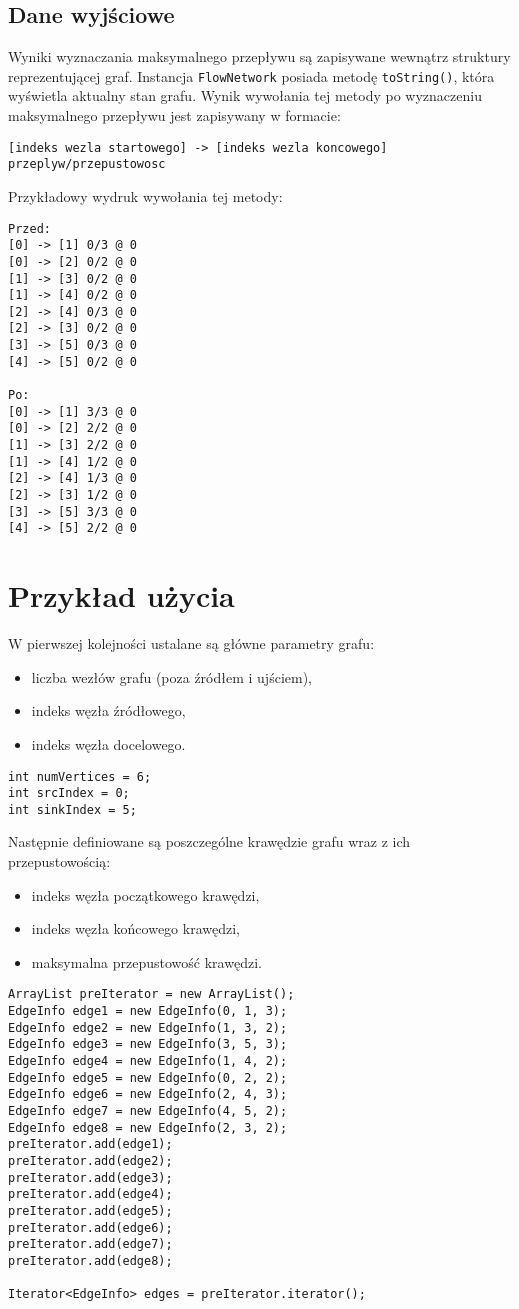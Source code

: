 \documentclass[10pt]{dokument-tiwo}
\begin{document}
\subsection{Dane wyjściowe}
Wyniki wyznaczania maksymalnego przepływu są zapisywane wewnątrz struktury
reprezentującej graf. Instancja \texttt{FlowNetwork} posiada metodę
\texttt{toString()}, która wyświetla aktualny stan grafu. Wynik wywołania
tej metody po wyznaczeniu maksymalnego przepływu jest zapisywany w formacie:
\begin{lstlisting}
[indeks wezla startowego] -> [indeks wezla koncowego] przeplyw/przepustowosc
\end{lstlisting}

\noindent
Przykładowy wydruk wywołania tej metody:
\begin{lstlisting}
Przed:
[0] -> [1] 0/3 @ 0
[0] -> [2] 0/2 @ 0
[1] -> [3] 0/2 @ 0
[1] -> [4] 0/2 @ 0
[2] -> [4] 0/3 @ 0
[2] -> [3] 0/2 @ 0
[3] -> [5] 0/3 @ 0
[4] -> [5] 0/2 @ 0

Po:
[0] -> [1] 3/3 @ 0
[0] -> [2] 2/2 @ 0
[1] -> [3] 2/2 @ 0
[1] -> [4] 1/2 @ 0
[2] -> [4] 1/3 @ 0
[2] -> [3] 1/2 @ 0
[3] -> [5] 3/3 @ 0
[4] -> [5] 2/2 @ 0
\end{lstlisting}


\section{Przykład użycia}
W pierwszej kolejności ustalane są główne parametry grafu:
\begin{itemize}[nosep]
    \item liczba wezłów grafu (poza źródłem i ujściem),
    \item indeks węzła źródłowego,
    \item indeks węzła docelowego.
\end{itemize}
\begin{lstlisting}
int numVertices = 6;
int srcIndex = 0;
int sinkIndex = 5;
\end{lstlisting}

\noindent
Następnie definiowane są poszczególne krawędzie grafu wraz z ich
przepustowością:
\begin{itemize}[nosep]
    \item indeks węzła początkowego krawędzi,
    \item indeks węzła końcowego krawędzi,
    \item maksymalna przepustowość krawędzi.
\end{itemize}
\begin{lstlisting}
ArrayList preIterator = new ArrayList();
EdgeInfo edge1 = new EdgeInfo(0, 1, 3);
EdgeInfo edge2 = new EdgeInfo(1, 3, 2);
EdgeInfo edge3 = new EdgeInfo(3, 5, 3);
EdgeInfo edge4 = new EdgeInfo(1, 4, 2);
EdgeInfo edge5 = new EdgeInfo(0, 2, 2);
EdgeInfo edge6 = new EdgeInfo(2, 4, 3);
EdgeInfo edge7 = new EdgeInfo(4, 5, 2);
EdgeInfo edge8 = new EdgeInfo(2, 3, 2);
preIterator.add(edge1);
preIterator.add(edge2);
preIterator.add(edge3);
preIterator.add(edge4);
preIterator.add(edge5);
preIterator.add(edge6);
preIterator.add(edge7);
preIterator.add(edge8);

Iterator<EdgeInfo> edges = preIterator.iterator();
\end{lstlisting}
\end{document}
